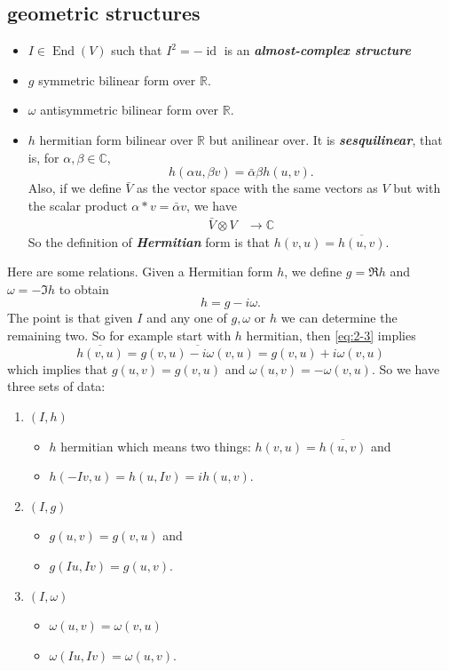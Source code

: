 \documentclass{article}
\newcommand{\R}{\mathbb{R}}
\newcommand{\C}{\mathbb{C}}
\DeclareMathOperator{\id}{id}
\DeclareMathOperator{\End}{End}
\begin{document}
\subsection{geometric structures}
\begin{defn}\leavevmode
	\begin{itemize}
		\item $I\in\End(V)$ such that $I^2=-\id$ is an \textbf{\textit{almost-complex structure}}
		\item $g$ symmetric bilinear form over $\R$.
		\item $\omega$ antisymmetric bilinear form over $\R$.
		\item $h$ hermitian form bilinear over $\R$ but anilinear over. It is \textbf{\textit{sesquilinear}}, that is, for $\alpha,\beta\in\C$,
		\[h(\alpha u,\beta v)=\bar\alpha\beta h(u,v).\]
		Also, if we define $\bar V$ as the vector space with the same vectors as $V$ but with the scalar product $\alpha * v=\bar\alpha v$, we have
		\begin{align*}
			\bar V\otimes V&\to\C
		\end{align*}
		So the definition of \textbf{\textit{Hermitian}} form is that $h(v,u)=\overline{h(u,v)}$.
	\end{itemize}
\end{defn}
Here are some relations. Given a Hermitian form $h$, we define $g=\Re h$ and $\omega=-\Im h$ to obtain
\begin{equation}\label{eq:2-3}
	h=g-i\omega.
\end{equation}
The point is that given $I$ and any one of $g,\omega$ or $h$ we can determine the remaining two. So for example start with $h$ hermitian, then \cref{eq:2-3} implies
\[\overline{h(v,u)}=\overline{g(v,u)-i\omega(v,u)}=g(v,u)+i\omega(v,u)\]
which implies that $g(u,v)=g(v,u)$ and $\omega(u,v)=-\omega(v,u)$.
So we have three sets of data:
\begin{enumerate}
	\item $(I,h)$
	\begin{itemize}
		\item $h$ hermitian which means two things: $h(v,u)=\overline{h(u,v)}$ and
		\item $h(-Iv,u)=h(u,Iv)=ih(u,v)$.
	\end{itemize}
	\item $(I,g)$
	\begin{itemize}
		\item $g(u,v)=g(v,u)$ and
		\item $g(Iu,Iv)=g(u,v)$.
	\end{itemize}
	\item $(I,\omega)$
	\begin{itemize}
		\item $\omega(u,v)=\omega(v,u)$
		\item $\omega(Iu,Iv)=\omega(u,v)$.
	\end{itemize}
\end{enumerate}
\end{document}
